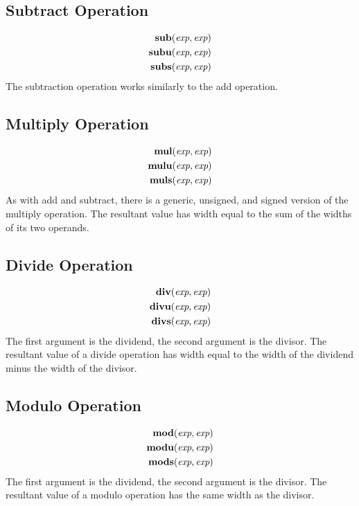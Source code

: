 \documentclass[12pt]{article}
\begin{document}
\subsection{Subtract Operation}
\[
\begin{aligned}
\text{\bf sub}(\text{\em exp}, \text{\em exp})      \\
\text{\bf subu}(\text{\em exp}, \text{\em exp})     \\
\text{\bf subs}(\text{\em exp}, \text{\em exp})     \\
\end{aligned}
\]
The subtraction operation works similarly to the add operation.

\subsection{Multiply Operation}
\[
\begin{aligned}
\text{\bf mul}(\text{\em exp}, \text{\em exp})      \\
\text{\bf mulu}(\text{\em exp}, \text{\em exp})     \\
\text{\bf muls}(\text{\em exp}, \text{\em exp})     \\
\end{aligned}
\]
As with add and subtract, there is a generic, unsigned, and signed version of the multiply operation. The resultant value has width equal to the sum of the widths of its two operands.

\subsection{Divide Operation}
\[
\begin{aligned}
\text{\bf div}(\text{\em exp}, \text{\em exp})      \\
\text{\bf divu}(\text{\em exp}, \text{\em exp})     \\
\text{\bf divs}(\text{\em exp}, \text{\em exp})     \\
\end{aligned}
\]
The first argument is the dividend, the second argument is the divisor. The resultant value of a divide operation has width equal to the width of the dividend minus the width of the divisor.

\subsection{Modulo Operation}
\[
\begin{aligned}
\text{\bf mod}(\text{\em exp}, \text{\em exp})      \\
\text{\bf modu}(\text{\em exp}, \text{\em exp})     \\
\text{\bf mods}(\text{\em exp}, \text{\em exp})     \\
\end{aligned}
\]
The first argument is the dividend, the second argument is the divisor. The resultant value of a modulo operation has the same width as the divisor.
\end{document}
